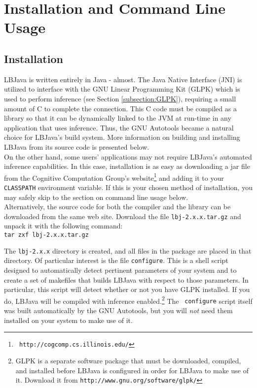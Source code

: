 
\chapter{Installation and Command Line Usage}

\section{Installation} \label{section:installation}

LBJava is written entirely in Java - almost.  The Java Native Interface (JNI) is
utilized to interface with the GNU Linear Programming Kit (GLPK) which is used
to perform inference (see Section \ref{subsection:GLPK}), requiring a small
amount of C to complete the connection.  This C code must be compiled as a
library so that it can be dynamically linked to the JVM at run-time in any
application that uses inference.  Thus, the GNU Autotools became a natural
choice for LBJava's build system.  More information on building and installing
LBJava from its source code is presented below. \\

On the other hand, some users' applications may not require LBJava's automated
inference capabilities.  In this case, installation is as easy as downloading
a jar file from the Cognitive Computation Group's website\footnote{{\tt
http://cogcomp.cs.illinois.edu/}} and adding it to your {\tt CLASSPATH}
environment variable. If this is
your chosen method of installation, you may safely skip to the section on
command line usage below. \\

Alternatively, the source code for both the compiler and the library can be
downloaded from the same web site.  Download the file {\tt lbj-2.x.x.tar.gz}
and unpack it with the following command: \\

\vspace{-.25cm}
{\tt tar zxf lbj-2.x.x.tar.gz} \\
\vspace{-.25cm}

\noindent
The {\tt lbj-2.x.x} directory is created, and all files in the package are
placed in that directory.  Of particular interest is the file {\tt configure}.
This is a shell script designed to automatically detect pertinent parameters
of your system and to create a set of makefiles that builds LBJava with respect
to those parameters.  In particular, this script will detect whether or not
you have GLPK installed.  If you do, LBJava will be compiled with inference
enabled.\footnote{GLPK is a separate software package that must be downloaded,
compiled, and installed before LBJava is configured in order for LBJava to make use
of it.  Download it from {\tt http://www.gnu.org/software/glpk/}}  The {\tt
configure} script itself was built automatically by the GNU Autotools, but you
will \emph{not} need them installed on your system to make use of it. \\

